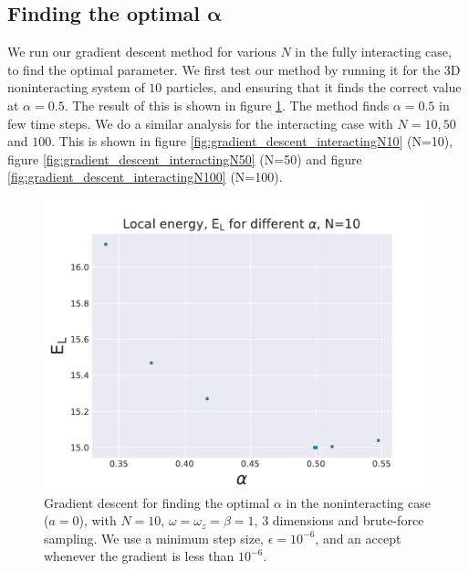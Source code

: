 \documentclass[a4paper, 10pt]{article}
\begin{document}
	\subsection{Finding the optimal $\boldsymbol{\alpha}$}
	We run our gradient descent method for various $N$ in the fully interacting case, to find the optimal parameter. We first test our method by running it for the 3D noninteracting system of $10$ particles, and ensuring that it finds the correct value at $\alpha=0.5$. The result of this is shown in figure \ref{fig:gradient_descent_noninteracting}. 	The method finds $\alpha=0.5$ in few time steps. We do a similar analysis for the interacting case with $N=10,50$ and $100$. This is shown in figure \ref{fig:gradient_descent_interactingN10} (N=10), figure \ref{fig:gradient_descent_interactingN50} (N=50) and figure \ref{fig:gradient_descent_interactingN100} (N=100).
	\pagebreak
			\begin{figure}[ht!]
				\centering
				\includegraphics[scale=0.8]{../Results/E_v_alpha_gradient_noninteracting.pdf}
				\caption{Gradient descent for finding the optimal $\alpha$ in the noninteracting case ($a=0$), with $N=10$, $\omega=\omega_z=\beta=1$, 3 dimensions and brute-force sampling. We use a minimum step size, $\epsilon=10^{-6}$, and an accept whenever the gradient is less than $10^{-6}$.}\label{fig:gradient_descent_noninteracting}
			\end{figure}
\end{document}
